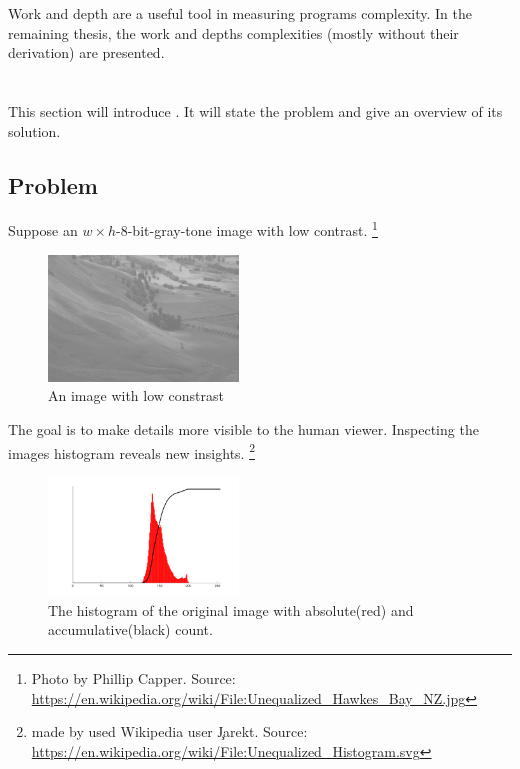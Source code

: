   Work and depth are a useful tool in measuring
  programs complexity. In the remaining thesis,
  the work and depths complexities (mostly without their derivation)
  are presented.
   
\section{\algo}
  \label{section:hbalanceintro}
  This section will introduce \algo. It will state the problem and give an overview of its solution.
  
  \subsection{Problem}
  Suppose an $w \times h$-8-bit-gray-tone image with low contrast.
  \footnote{Photo by Phillip Capper. Source: \url{https://en.wikipedia.org/wiki/File:Unequalized_Hawkes_Bay_NZ.jpg}}
      
      \begin{figure}[h]
        \centering
        \includegraphics[width=0.45\textwidth]{img-org}
        \caption{An image with low constrast}
        \label{fig:img-org}
      \end{figure}
      The goal is to make details more visible to the human viewer.
      Inspecting the images histogram reveals new insights.
      \footnote{made by used Wikipedia user \c{Jarekt}. Source: \url{https://en.wikipedia.org/wiki/File:Unequalized_Histogram.svg}}
      
      \begin{figure}[h]
        \centering
        \includegraphics[width=0.45\textwidth]{hist-org}
        \caption{The histogram of the original image with absolute(red) and accumulative(black) count.}
        \label{fig:hist-org}
      \end{figure}
      
